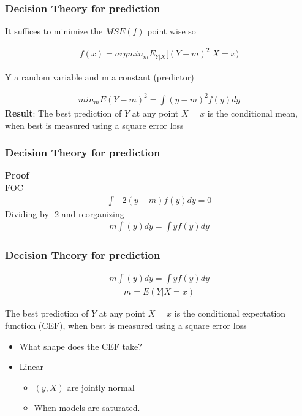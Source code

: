 \documentclass[
  shownotes,
  xcolor={svgnames},
  hyperref={colorlinks,citecolor=DarkBlue,linkcolor=DarkRed,urlcolor=DarkBlue}
  , aspectratio=169]{beamer}
\begin{document}
\begin{frame}
\frametitle{ Decision Theory for prediction}


It suffices to minimize  the $MSE(f)$ point wise so

\begin{align}
f(x)= argmin_m E_{Y|X} [(Y-m)^2|X=x)
\end{align}

Y a random variable and m a constant (predictor)

\begin{align}
min_m E(Y-m)^2= \int (y-m)^2  f(y)dy
\end{align}
\medskip
{\bf Result}: The best prediction of $Y$ at any point $X = x$ is the conditional mean, when best is measured using a square error loss

\end{frame}

\begin{frame}[t]
\frametitle{ Decision Theory for prediction}

{\bf Proof} \\
\medskip
FOC
\medskip
\begin{align}
\int -2 (y-m)  f(y)  dy =0
\end{align}
\medskip
Dividing by -2 and reorganizing
\medskip
\begin{align}
 m \int (y) dy = \int y f(y)  dy
\end{align}


\end{frame}

\begin{frame}
\frametitle{ Decision Theory for prediction}


\begin{align}
 m \int (y) dy = \int y f(y)  dy
\end{align}
\begin{align}
m=E(Y|X=x)
\end{align}


The best prediction of $Y$ at any point $X = x$ is the conditional expectation function (CEF), when best is measured using a square error loss
\begin{itemize}
\item What shape does the CEF take?
\item Linear 
\begin{itemize}
\item $(y,X)$ are jointly normal
\item When models are saturated.
\end{itemize}
\end{itemize}


\end{frame}
\end{document}
